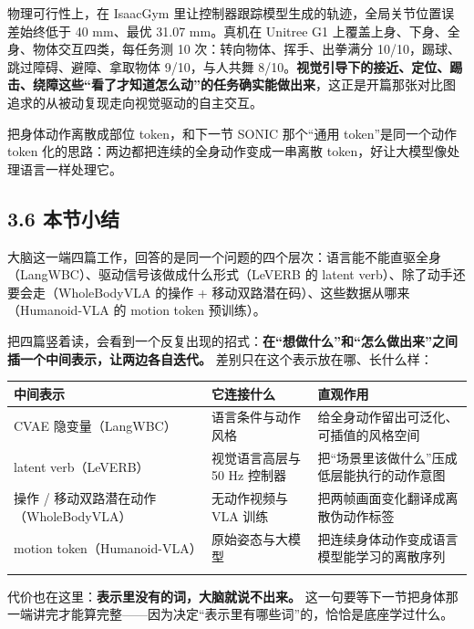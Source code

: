 \documentclass[
  chinese,
]{ctexart}
\begin{document}
物理可行性上，在 IsaacGym
里让控制器跟踪模型生成的轨迹，全局关节位置误差始终低于 40 mm、最优 31.07
mm。真机在 Unitree G1 上覆盖上身、下身、全身、物体交互四类，每任务测 10
次：转向物体、挥手、出拳满分 10/10，踢球、跳过障碍、避障、拿取物体
9/10，与人共舞
8/10。\textbf{视觉引导下的接近、定位、踢击、绕障这些``看了才知道怎么动''的任务确实能做出来}，这正是开篇那张对比图追求的从被动复现走向视觉驱动的自主交互。

把身体动作离散成部位 token，和下一节 SONIC 那个``通用
token''是同一个动作 token 化的思路：两边都把连续的全身动作变成一串离散
token，好让大模型像处理语言一样处理它。

\subsection{3.6 本节小结}\label{ux672cux8282ux5c0fux7ed3-2}

大脑这一端四篇工作，回答的是同一个问题的四个层次：语言能不能直驱全身（LangWBC）、驱动信号该做成什么形式（LeVERB
的 latent verb）、除了动手还要会走（WholeBodyVLA 的操作 +
移动双路潜在码）、这些数据从哪来（Humanoid-VLA 的 motion token
预训练）。

把四篇竖着读，会看到一个反复出现的招式：\textbf{在``想做什么''和``怎么做出来''之间插一个中间表示，让两边各自迭代。}
差别只在这个表示放在哪、长什么样：

\begin{center}
\begin{tabular}{@{}>{\raggedright\arraybackslash}p{} >{\raggedright\arraybackslash}p{} >{\raggedright\arraybackslash}p{}@{}}
\toprule\noalign{}
中间表示 & 它连接什么 & 直观作用 \\
\midrule\noalign{}
CVAE 隐变量（LangWBC） & 语言条件与动作风格 & 给全身动作留出可泛化、可插值的风格空间 \\
latent verb（LeVERB） & 视觉语言高层与 50 Hz 控制器 & 把``场景里该做什么''压成低层能执行的动作意图 \\
操作 / 移动双路潜在动作（WholeBodyVLA） & 无动作视频与 VLA 训练 & 把两帧画面变化翻译成离散伪动作标签 \\
motion token（Humanoid-VLA） & 原始姿态与大模型 & 把连续身体动作变成语言模型能学习的离散序列 \\
\bottomrule\noalign{}
\end{tabular}
\end{center}

代价也在这里：\textbf{表示里没有的词，大脑就说不出来。}
这一句要等下一节把身体那一端讲完才能算完整------因为决定``表示里有哪些词''的，恰恰是底座学过什么。
\end{document}
